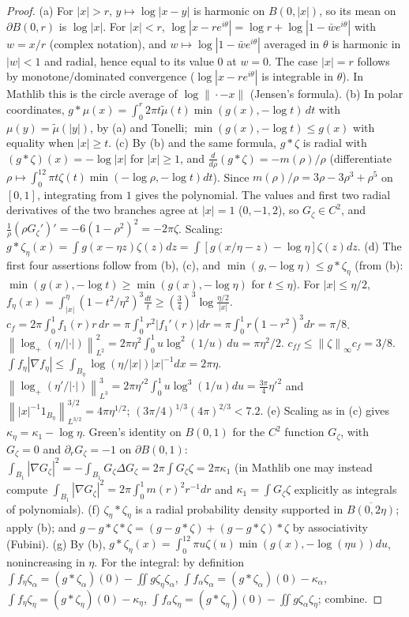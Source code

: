 \documentclass[11pt,reqno]{amsart}
\numberwithin{equation}{section}
\theoremstyle{plain}
\theoremstyle{definition}
\newcommand{\norm}[1]{\left\|#1\right\|}
\begin{document}
\begin{proof}
(a) For $|x|>r$, $y\mapsto\log|x-y|$ is harmonic on $B(0,|x|)$, so its mean on $\partial B(0,r)$ is $\log|x|$.  For $|x|<r$, $\log|x-re^{i\theta}|=\log r+\log|1-\bar w e^{i\theta}|$ with $w=x/r$ (complex notation), and $w\mapsto\log|1-\bar we^{i\theta}|$ averaged in $\theta$ is harmonic in $|w|<1$ and radial, hence equal to its value $0$ at $w=0$.  The case $|x|=r$ follows by monotone/dominated convergence ($\log|x-re^{i\theta}|$ is integrable in $\theta$).  In Mathlib this is the circle average of $\log\|\cdot-x\|$ (Jensen's formula).
(b) In polar coordinates, $g*\mu(x)=\int_0^r2\pi t\tilde\mu(t)\min(g(x),-\log t)\,dt$ with $\mu(y)=\tilde\mu(|y|)$, by (a) and Tonelli; $\min(g(x),-\log t)\le g(x)$ with equality when $|x|\ge t$.
(c) By (b) and the same formula, $g*\zeta$ is radial with $(g*\zeta)(x)=-\log|x|$ for $|x|\ge1$, and $\frac d{d\rho}(g*\zeta)=-m(\rho)/\rho$ (differentiate $\rho\mapsto\int_0^12\pi t\zeta(t)\min(-\log\rho,-\log t)dt$).  Since $m(\rho)/\rho=3\rho-3\rho^3+\rho^5$ on $[0,1]$, integrating from $1$ gives the polynomial.  The values and first two radial derivatives of the two branches agree at $|x|=1$ ($0,-1,2$), so $G_\zeta\in C^2$, and $\frac1\rho(\rho G_\zeta')'=-6(1-\rho^2)^2=-2\pi\zeta$.  Scaling: $g*\zeta_\eta(x)=\int g(x-\eta z)\zeta(z)dz=\int[g(x/\eta-z)-\log\eta]\zeta(z)dz$.
(d) The first four assertions follow from (b), (c), and $\min(g,-\log\eta)\le g*\zeta_\eta$ (from (b): $\min(g(x),-\log t)\ge\min(g(x),-\log\eta)$ for $t\le\eta$).  For $|x|\le\eta/2$, $f_\eta(x)=\int_{|x|}^\eta(1-t^2/\eta^2)^3\frac{dt}t\ge(\frac34)^3\log\frac{\eta/2}{|x|}$.  $c_f=2\pi\int_0^1f_1(r)r\,dr=\pi\int_0^1r^2|f_1'(r)|dr=\pi\int_0^1r(1-r^2)^3dr=\pi/8$.  $\norm{\log_+(\eta/|\cdot|)}_{L^2}^2=2\pi\eta^2\int_0^1u\log^2(1/u)\,du=\pi\eta^2/2$.  $c_{ff}\le\norm\zeta_\infty c_f=3/8$.  $\int f_\eta|\nabla f_\eta|\le\int_{B_\eta}\log(\eta/|x|)|x|^{-1}dx=2\pi\eta$.  $\norm{\log_+(\eta'/|\cdot|)}_{L^3}^3=2\pi\eta'^2\int_0^1u\log^3(1/u)du=\frac{3\pi}4\eta'^2$ and $\norm{|x|^{-1}1_{B_\eta}}_{L^{3/2}}^{3/2}=4\pi\eta^{1/2}$; $(3\pi/4)^{1/3}(4\pi)^{2/3}<7.2$.
(e) Scaling as in (c) gives $\kappa_\eta=\kappa_1-\log\eta$.  Green's identity on $B(0,1)$ for the $C^2$ function $G_\zeta$, with $G_\zeta=0$ and $\partial_rG_\zeta=-1$ on $\partial B(0,1)$: $\int_{B_1}|\nabla G_\zeta|^2=-\int_{B_1}G_\zeta\Delta G_\zeta=2\pi\int G_\zeta\zeta=2\pi\kappa_1$ (in Mathlib one may instead compute $\int_{B_1}|\nabla G_\zeta|^2=2\pi\int_0^1m(r)^2r^{-1}dr$ and $\kappa_1=\int G_\zeta\zeta$ explicitly as integrals of polynomials).
(f) $\zeta_\eta*\zeta_\eta$ is a radial probability density supported in $\overline{B(0,2\eta)}$; apply (b); and $g-g*\zeta*\zeta=(g-g*\zeta)+(g-g*\zeta)*\zeta$ by associativity (Fubini).
(g) By (b), $g*\zeta_\eta(x)=\int_0^12\pi u\zeta(u)\min(g(x),-\log(\eta u))du$, nonincreasing in $\eta$.  For the integral: by definition $\int f_\eta\zeta_\alpha=(g*\zeta_\alpha)(0)-\iint g\zeta_\eta\zeta_\alpha$, $\int f_\alpha\zeta_\alpha=(g*\zeta_\alpha)(0)-\kappa_\alpha$, $\int f_\eta\zeta_\eta=(g*\zeta_\eta)(0)-\kappa_\eta$, $\int f_\alpha\zeta_\eta=(g*\zeta_\eta)(0)-\iint g\zeta_\alpha\zeta_\eta$; combine.
\end{proof}
\end{document}
